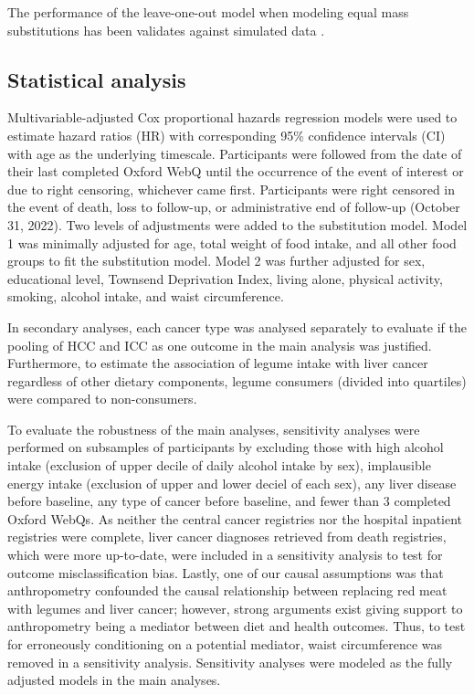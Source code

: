 \documentclass[sn-basic,Numbered,iicol,pdflatex]{sn-jnl}
\begin{document}
\noindent The performance of the leave-one-out model when modeling equal
mass substitutions has been validates against simulated data
\citep{Tomova2022}.

\hypertarget{subsec6}{%
\subsection{Statistical analysis}\label{subsec6}}

Multivariable-adjusted Cox proportional hazards regression models were
used to estimate hazard ratios (HR) with corresponding 95\% confidence
intervals (CI) with age as the underlying timescale. Participants were
followed from the date of their last completed Oxford WebQ until the
occurrence of the event of interest or due to right censoring, whichever
came first. Participants were right censored in the event of death, loss
to follow-up, or administrative end of follow-up (October 31, 2022). Two
levels of adjustments were added to the substitution model. Model 1 was
minimally adjusted for age, total weight of food intake, and all other
food groups to fit the substitution model. Model 2 was further adjusted
for sex, educational level, Townsend Deprivation Index, living alone,
physical activity, smoking, alcohol intake, and waist circumference.

In secondary analyses, each cancer type was analysed separately to
evaluate if the pooling of HCC and ICC as one outcome in the main
analysis was justified. Furthermore, to estimate the association of
legume intake with liver cancer regardless of other dietary components,
legume consumers (divided into quartiles) were compared to
non-consumers.

To evaluate the robustness of the main analyses, sensitivity analyses
were performed on subsamples of participants by excluding those with
high alcohol intake (exclusion of upper decile of daily alcohol intake
by sex), implausible energy intake (exclusion of upper and lower deciel
of each sex), any liver disease before baseline, any type of cancer
before baseline, and fewer than 3 completed Oxford WebQs. As neither the
central cancer registries nor the hospital inpatient registries were
complete, liver cancer diagnoses retrieved from death registries, which
were more up-to-date, were included in a sensitivity analysis to test
for outcome misclassification bias. Lastly, one of our causal
assumptions was that anthropometry confounded the causal relationship
between replacing red meat with legumes and liver cancer; however,
strong arguments exist giving support to anthropometry being a mediator
between diet and health outcomes. Thus, to test for erroneously
conditioning on a potential mediator, waist circumference was removed in
a sensitivity analysis. Sensitivity analyses were modeled as the fully
adjusted models in the main analyses.
\end{document}
